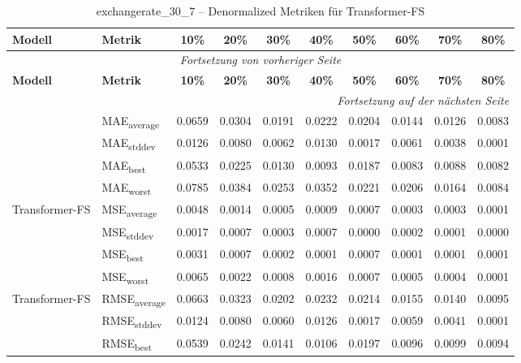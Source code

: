 {\small
\begin{longtable}{l l c c c c c c c c}
    \toprule
    \textbf{Modell} & \textbf{Metrik} & \textbf{10\%} & \textbf{20\%} & \textbf{30\%} & \textbf{40\%} & \textbf{50\%} & \textbf{60\%} & \textbf{70\%} & \textbf{80\%} \\
    \midrule
    \endfirsthead
    \multicolumn{10}{c}{\textit{Fortsetzung von vorheriger Seite}} \\
    \toprule
    \textbf{Modell} & \textbf{Metrik} & \textbf{10\%} & \textbf{20\%} & \textbf{30\%} & \textbf{40\%} & \textbf{50\%} & \textbf{60\%} & \textbf{70\%} & \textbf{80\%} \\
    \midrule
    \endhead
    \midrule
    \multicolumn{10}{r}{\textit{Fortsetzung auf der nächsten Seite}} \\
    \midrule
    \endfoot
    \bottomrule
    \caption{exchangerate_30_7 -- Denormalized Metriken für Transformer-FS}
    \label{tab:exchangerate_30_7_denormalized_transformer-fs}
    \endlastfoot
\multirow{4}{*}{Transformer-FS} & MAE\textsubscript{average} & 0.0659 & 0.0304 & 0.0191 & 0.0222 & 0.0204 & 0.0144 & 0.0126 & 0.0083 \\
 & MAE\textsubscript{stddev} & 0.0126 & 0.0080 & 0.0062 & 0.0130 & 0.0017 & 0.0061 & 0.0038 & 0.0001 \\
 & MAE\textsubscript{best} & 0.0533 & 0.0225 & 0.0130 & 0.0093 & 0.0187 & 0.0083 & 0.0088 & 0.0082 \\
 & MAE\textsubscript{worst} & 0.0785 & 0.0384 & 0.0253 & 0.0352 & 0.0221 & 0.0206 & 0.0164 & 0.0084 \\
\cmidrule(lr){2-10}
\multirow{4}{*}{Transformer-FS} & MSE\textsubscript{average} & 0.0048 & 0.0014 & 0.0005 & 0.0009 & 0.0007 & 0.0003 & 0.0003 & 0.0001 \\
 & MSE\textsubscript{stddev} & 0.0017 & 0.0007 & 0.0003 & 0.0007 & 0.0000 & 0.0002 & 0.0001 & 0.0000 \\
 & MSE\textsubscript{best} & 0.0031 & 0.0007 & 0.0002 & 0.0001 & 0.0007 & 0.0001 & 0.0001 & 0.0001 \\
 & MSE\textsubscript{worst} & 0.0065 & 0.0022 & 0.0008 & 0.0016 & 0.0007 & 0.0005 & 0.0004 & 0.0001 \\
\cmidrule(lr){2-10}
\multirow{4}{*}{Transformer-FS} & RMSE\textsubscript{average} & 0.0663 & 0.0323 & 0.0202 & 0.0232 & 0.0214 & 0.0155 & 0.0140 & 0.0095 \\
 & RMSE\textsubscript{stddev} & 0.0124 & 0.0080 & 0.0060 & 0.0126 & 0.0017 & 0.0059 & 0.0041 & 0.0001 \\
 & RMSE\textsubscript{best} & 0.0539 & 0.0242 & 0.0141 & 0.0106 & 0.0197 & 0.0096 & 0.0099 & 0.0094 \\

\end{longtable}}
